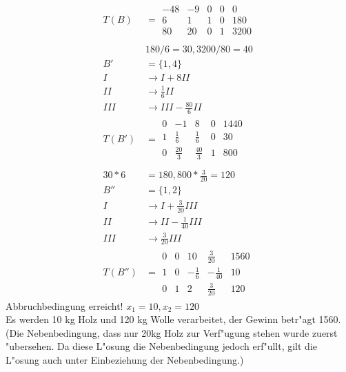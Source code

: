 \documentclass[fleqn,12pt]{scrartcl}
\begin{document}
\begin{align*}
	T(B) &= 
	\begin{array}{cccc|c}
		-48 & -9 & 0 & 0 & 0\\
		\hline
		6 & 1 & 1 & 0 & 180\\
		80 & 20 & 0 & 1 & 3200
	\end{array}\\
	&\\
	&180/6 = 30, 3200/80 = 40\\
	B' &= \{1, 4\}\\
	I &\rightarrow I + 8II\\
	II &\rightarrow \frac16 II\\
	III &\rightarrow III - \frac{80}6 II\\
	T(B') &=
	\begin{array}{cccc|c}
		0 & -1 & 8 & 0 & 1440\\
		\hline
		1 & \frac16 & \frac16 & 0 & 30\\
		0 & \frac{20}3 & \frac{40}3 & 1 & 800
	\end{array}
	\\
	\\
	30*6 &= 180, 800*\frac3{20}= 120\\
	B'' &= \{1, 2\}\\
	I &\rightarrow I + \frac3{20}III\\
	II &\rightarrow II - \frac1{40}III\\
	III &\rightarrow \frac3{20} III\\
	T(B'') &= \begin{array}{cccc|c}
		0 & 0 & 10 & \frac3{20} & 1560 \\
		1 & 0 & -\frac16 & -\frac1{40} & 10 \\
		0 & 1 & 2 & \frac3{20} & 120
	\end{array}
\end{align*}
Abbruchbedingung erreicht! $x_1 = 10, x_2 = 120$\\
Es werden 10 kg Holz und 120 kg Wolle verarbeitet, der Gewinn betr"agt 1560. \\
(Die Nebenbedingung, dass nur 20kg Holz zur Verf"ugung stehen wurde zuerst "ubersehen. Da diese L"osung die Nebenbedingung jedoch erf"ullt, gilt die L"osung auch unter Einbeziehung der Nebenbedingung.)
\end{document}
